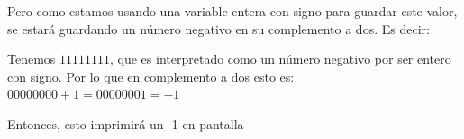 \documentclass[12pt,letterpaper]{article}
\begin{document}
\begin{enumerate}
    Pero como estamos usando una variable entera con signo para guardar este valor, se estará guardando un número negativo en su complemento a dos. Es decir:

    Tenemos $11111111$, que es interpretado como un número negativo por ser entero con signo. Por lo que en complemento a dos esto es: $00000000 + 1 = 00000001 = -1$

    Entonces, esto imprimirá un -1 en pantalla
        
\end{enumerate}
\end{document}
